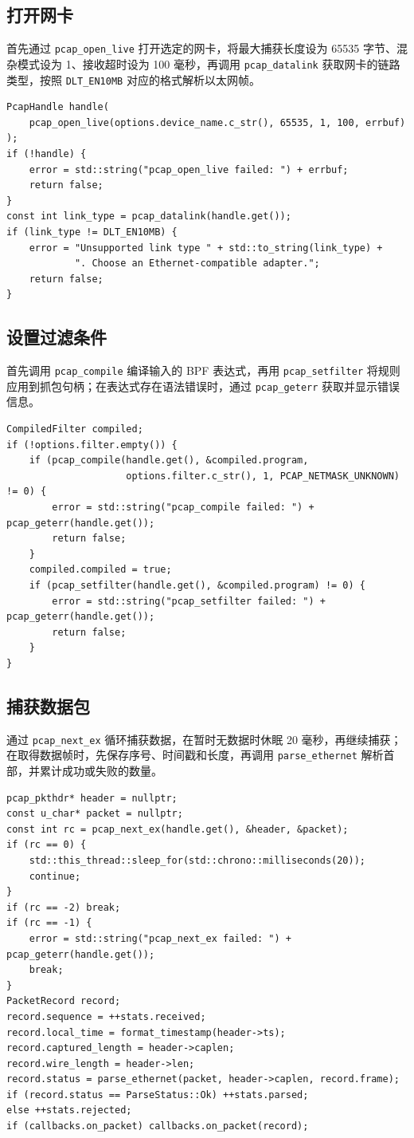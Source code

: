 \documentclass[UTF8,a4paper,11pt,scheme=chinese]{ctexart}
\newcommand{\code}[1]{\texttt{#1}}
\begin{document}
\subsection{打开网卡}
首先通过 \code{pcap\_open\_live} 打开选定的网卡，将最大捕获长度设为 65535 字节、混杂模式设为 1、接收超时设为 100 毫秒，再调用 \code{pcap\_datalink} 获取网卡的链路类型，按照 \code{DLT\_EN10MB} 对应的格式解析以太网帧。
\begin{lstlisting}
PcapHandle handle(
    pcap_open_live(options.device_name.c_str(), 65535, 1, 100, errbuf)
);
if (!handle) {
    error = std::string("pcap_open_live failed: ") + errbuf;
    return false;
}
const int link_type = pcap_datalink(handle.get());
if (link_type != DLT_EN10MB) {
    error = "Unsupported link type " + std::to_string(link_type) +
            ". Choose an Ethernet-compatible adapter.";
    return false;
}
\end{lstlisting}

\subsection{设置过滤条件}
首先调用 \code{pcap\_compile} 编译输入的 BPF 表达式，再用 \code{pcap\_setfilter} 将规则应用到抓包句柄；在表达式存在语法错误时，通过 \code{pcap\_geterr} 获取并显示错误信息。
\begin{lstlisting}
CompiledFilter compiled;
if (!options.filter.empty()) {
    if (pcap_compile(handle.get(), &compiled.program,
                     options.filter.c_str(), 1, PCAP_NETMASK_UNKNOWN) != 0) {
        error = std::string("pcap_compile failed: ") + pcap_geterr(handle.get());
        return false;
    }
    compiled.compiled = true;
    if (pcap_setfilter(handle.get(), &compiled.program) != 0) {
        error = std::string("pcap_setfilter failed: ") + pcap_geterr(handle.get());
        return false;
    }
}
\end{lstlisting}

\subsection{捕获数据包}
通过 \code{pcap\_next\_ex} 循环捕获数据，在暂时无数据时休眠 20 毫秒，再继续捕获；在取得数据帧时，先保存序号、时间戳和长度，再调用 \code{parse\_ethernet} 解析首部，并累计成功或失败的数量。
\begin{lstlisting}
pcap_pkthdr* header = nullptr;
const u_char* packet = nullptr;
const int rc = pcap_next_ex(handle.get(), &header, &packet);
if (rc == 0) {
    std::this_thread::sleep_for(std::chrono::milliseconds(20));
    continue;
}
if (rc == -2) break;
if (rc == -1) {
    error = std::string("pcap_next_ex failed: ") + pcap_geterr(handle.get());
    break;
}
PacketRecord record;
record.sequence = ++stats.received;
record.local_time = format_timestamp(header->ts);
record.captured_length = header->caplen;
record.wire_length = header->len;
record.status = parse_ethernet(packet, header->caplen, record.frame);
if (record.status == ParseStatus::Ok) ++stats.parsed;
else ++stats.rejected;
if (callbacks.on_packet) callbacks.on_packet(record);
\end{lstlisting}
\end{document}
